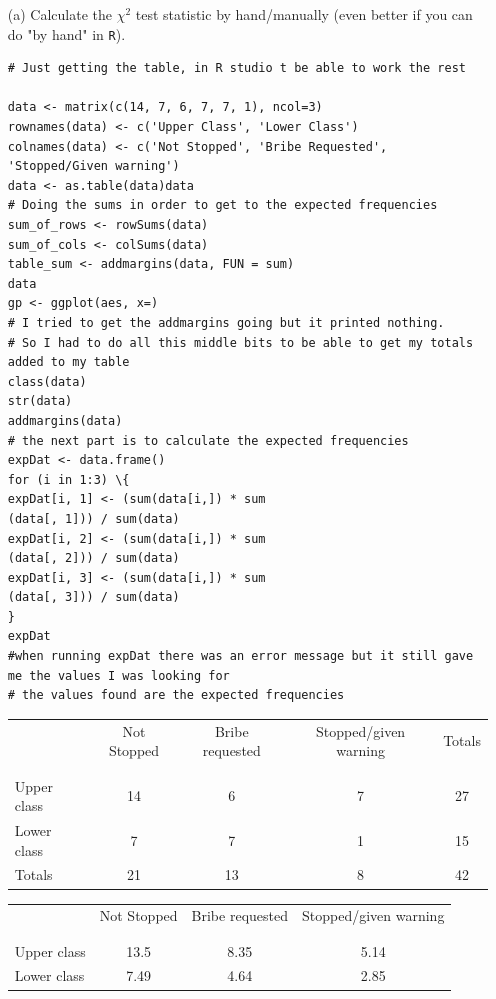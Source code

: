 \documentclass[12pt,letterpaper]{article}
\begin{document}
\begin{enumerate}
	
	\item [(a)]
	Calculate the $\chi^2$ test statistic by hand/manually (even better if you can do "by hand" in \texttt{R}).\\
	\vspace{7cm}
\begin{lstlisting}
# Just getting the table, in R studio t be able to work the rest

data <- matrix(c(14, 7, 6, 7, 7, 1), ncol=3)
rownames(data) <- c('Upper Class', 'Lower Class')
colnames(data) <- c('Not Stopped', 'Bribe Requested', 'Stopped/Given warning')
data <- as.table(data)data
# Doing the sums in order to get to the expected frequencies
sum_of_rows <- rowSums(data)
sum_of_cols <- colSums(data)
table_sum <- addmargins(data, FUN = sum)
data
gp <- ggplot(aes, x=)
# I tried to get the addmargins going but it printed nothing.
# So I had to do all this middle bits to be able to get my totals added to my table
class(data)
str(data)
addmargins(data)
# the next part is to calculate the expected frequencies
expDat <- data.frame() 
for (i in 1:3) \{  
expDat[i, 1] <- (sum(data[i,]) * sum
(data[, 1])) / sum(data) 
expDat[i, 2] <- (sum(data[i,]) * sum
(data[, 2])) / sum(data)  
expDat[i, 3] <- (sum(data[i,]) * sum
(data[, 3])) / sum(data)
}
expDat
#when running expDat there was an error message but it still gave me the values I was looking for 
# the values found are the expected frequencies
\end{lstlisting}		

\begin{table}[h!]
 \centering
\begin{tabular}{l | c c c c}
   & Not Stopped & Bribe requested & Stopped/given warning & Totals \\
   \\[-1.8ex]
   \hline\\[-1.8ex]
   Upper class & 14 & 6 & 7 & 27 \\
   Lower class & 7 & 7 & 1 & 15 \\
   Totals & 21 & 13 & 8 & 42 \\
   \hline
   \end{tabular}
\end{table}

\begin{table}[h!]
	\centering
	\begin{tabular}{l | c c c }
		& Not Stopped & Bribe requested & Stopped/given warning \\
		\\[-1.8ex] 
		\hline \\[-1.8ex]
		Upper class & 13.5 & 8.35 & 5.14 \\
		Lower class & 7.49 & 4.64 & 2.85 \\
		\hline
	\end{tabular}
\end{table}




\end{enumerate}
\end{document}
